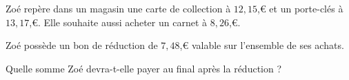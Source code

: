 \documentclass[11pt]{article}
\begin{document}
\begin{exercicedevoir}
Zoé repère dans un magasin une carte de collection à $12{,}15$,€ et un porte-clés à $13{,}17$,€.
Elle souhaite aussi acheter un carnet à $8{,}26$,€.

\medskip

Zoé possède un bon de réduction de $7{,}48$,€ valable sur l'ensemble de ses achats.

\medskip

Quelle somme Zoé devra-t-elle payer au final après la réduction ? 
\end{exercicedevoir}
\vspace{-.5cm}
\encart{5cm}
\end{document}
